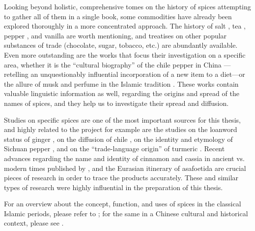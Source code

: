 Looking beyond holistic, comprehensive tomes on the history of spices attempting to gather all of them in a single book, some commodities have already been explored thoroughly in a more concentrated approach. The history of salt \autocite{kurlansky_salt_2002}, tea \autocite{mair_true_2009}, pepper \autocite{shaffer_pepper_2013}, and vanilla \autocite{rain_vanilla_2004} are worth mentioning, and treatises on other popular substances of trade (chocolate, sugar, tobacco, etc.) are abundantly available. Even more outstanding are the works that focus their investigation on a specific area, whether it is the ``cultural biography'' of the chile pepper in China \autocite{dott_chile_2020}---retelling an unquestionably influential incorporation of a new item to a diet---or the allure of musk and perfume in the Islamic tradition \autocite{king_musk_2007}. These works contain valuable linguistic information as well, regarding the origins and spread of the names of spices, and they help us to investigate their spread and diffusion. 

Studies on specific spices are one of the most important sources for this thesis, and highly related to the project for example are the studies on the loanword status of ginger \autocite{ross_ginger_1952}, on the diffusion of chile \autocite{wright_medieval_2007}, on the identity and etymology of Sichuan pepper \autocite{austin_sichuan_2008}, and on the ``trade-language origin'' of turmeric \autocite{guthrie_trade-language_2009}. Recent advances regarding the name and identity of cinnamon and cassia in ancient vs. modern times published by \textcite{haw_cinnamon_2017}, and the Eurasian itinerary of asafoetida \autocite{leung_itinerary_2019} are crucial pieces of research in order to trace the products accurately. These and similar types of research were highly influential in the preparation of this thesis.

For an overview about the concept, function, and uses of spices in the classical Islamic periods, please refer to \textcite{dietrich_afawih_2004}; for the same in a Chinese cultural and historical context, please see \textcite[147-153]{hu_food_2005}.




